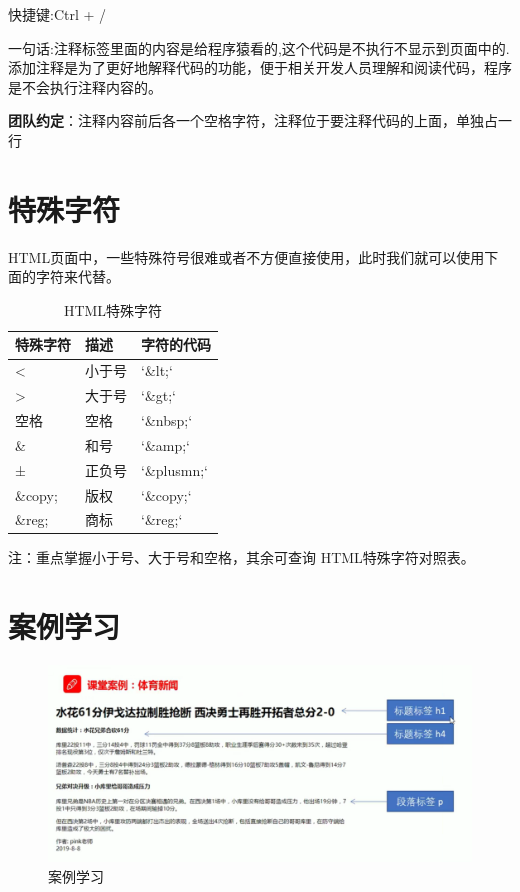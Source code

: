 \documentclass[
]{book}
\begin{document}
快捷键:Ctrl + /

一句话:注释标签里面的内容是给程序猿看的,这个代码是不执行不显示到页面中的.
添加注释是为了更好地解释代码的功能，便于相关开发人员理解和阅读代码，程序是不会执行注释内容的。

\textbf{团队约定}：注释内容前后各一个空格字符，注释位于要注释代码的上面，单独占一行

\hypertarget{ux7279ux6b8aux5b57ux7b26}{%
\section{特殊字符}\label{ux7279ux6b8aux5b57ux7b26}}

HTML页面中，一些特殊符号很难或者不方便直接使用，此时我们就可以使用下面的字符来代替。

\begin{table}

\caption{\label{tab:unnamed-chunk-13}HTML特殊字符}
\centering
\begin{tabular}[t]{lll}
\toprule
特殊字符 & 描述 & 字符的代码\\
\midrule
< & 小于号 & `\&lt;`\\
> & 大于号 & `\&gt;`\\
空格 & 空格 & `\&nbsp;`\\
\& & 和号 & `\&amp;`\\
± & 正负号 & `\&plusmn;`\\
\addlinespace
\&copy; & 版权 & `\&copy;`\\
\&reg; & 商标 & `\&reg;`\\
\bottomrule
\end{tabular}
\end{table}

注：重点掌握小于号、大于号和空格，其余可查询
HTML特殊字符对照表。

\hypertarget{ux6848ux4f8bux5b66ux4e60}{%
\section{案例学习}\label{ux6848ux4f8bux5b66ux4e60}}

\begin{figure}

{\centering \includegraphics{fig/1-7} 

}

\caption{案例学习}\label{fig:unnamed-chunk-14}
\end{figure}
\end{document}
